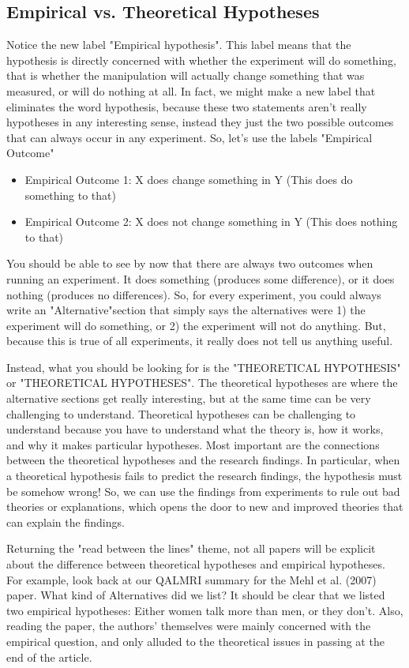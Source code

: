 \subsection{Empirical vs. Theoretical Hypotheses}

Notice the new label "Empirical hypothesis". This label means that the hypothesis is directly concerned with whether the experiment will do something, that is whether the manipulation will actually change something that was measured, or will do nothing at all. In fact, we might make a new label that eliminates the word hypothesis, because these two statements aren't really hypotheses in any interesting sense, instead they just the two possible outcomes that can always occur in any experiment. So, let's use the labels "Empirical Outcome"

\begin{itemize}
\item Empirical Outcome 1: X does change something in Y (This does do something to that)
\item Empirical Outcome 2: X does not change something in Y (This does nothing to that)
\end{itemize}

You should be able to see by now that there are always two outcomes when running an experiment. It does something (produces some difference), or it does nothing (produces no differences). So, for every experiment, you could always write an "Alternative"section that simply says the alternatives were 1) the experiment will do something, or 2) the experiment will not do anything. But, because this is true of all experiments, it really does not tell us anything useful. 

Instead, what you should be looking for is the "THEORETICAL HYPOTHESIS" or "THEORETICAL HYPOTHESES". The theoretical hypotheses are where the alternative sections get really interesting, but at the same time can be very challenging to understand. Theoretical hypotheses can be challenging to understand because you have to understand what the theory is, how it works, and why it makes particular hypotheses. Most important are the connections between the theoretical hypotheses and the research findings. In particular, when a theoretical hypothesis fails to predict the research findings, the hypothesis must be somehow wrong! So, we can use the findings from experiments to rule out bad theories or explanations, which opens the door to new and improved theories that can explain the findings. 

 Returning the "read between the lines" theme, not all papers will be explicit about the difference between theoretical hypotheses and empirical hypotheses. For example, look back at our QALMRI summary for the Mehl et al. (2007) paper. What kind of Alternatives did we list? It should be clear that we listed two empirical hypotheses: Either women talk more than men, or they don't. Also, reading the paper, the authors' themselves were mainly concerned with the empirical question, and only alluded to the theoretical issues in passing at the end of the article. 

